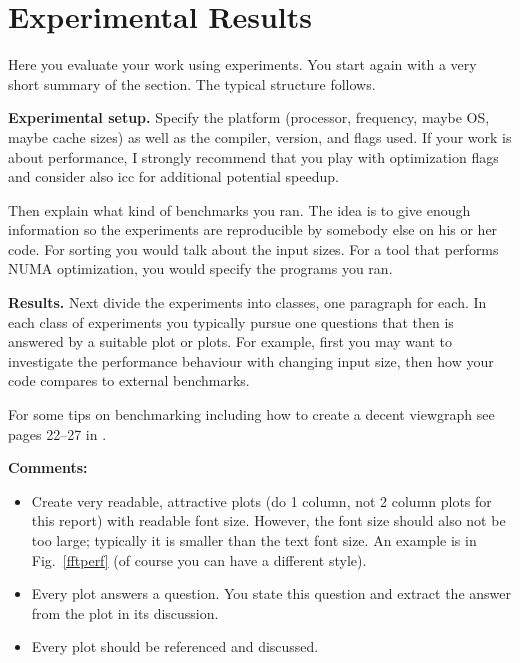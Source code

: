 \documentclass[letterpaper]{article}
\newcommand{\mypar}[1]{{\bf #1.}}
\begin{document}
\section{Experimental Results}\label{sec:exp}

Here you evaluate your work using experiments. You start again with a
very short summary of the section. The typical structure follows.

\mypar{Experimental setup} Specify the platform (processor, frequency, maybe OS, maybe cache sizes)
as well as the compiler, version, and flags used. If your work is about performance, 
I strongly recommend that you play with optimization flags and consider also icc for additional potential speedup.

Then explain what kind of benchmarks you ran. The idea is to give enough information so the experiments are reproducible by somebody else on his or her code.
For sorting you would talk about the input sizes. For a tool that performs NUMA optimization, you would specify the programs you ran.

\mypar{Results}
Next divide the experiments into classes, one paragraph for each. In each class of experiments you typically pursue one questions that then is answered by a suitable plot or plots. For example, first you may want to investigate the performance behaviour with changing input size, then how your code compares to external benchmarks.

For some tips on benchmarking including how to create a decent viewgraph see pages 22--27 in \cite{Pueschel:10}.

{\bf Comments:}
\begin{itemize}
\item Create very readable, attractive plots (do 1 column, not 2 column plots
for this report) with readable font size. However, the font size should also not be too large; typically it is smaller than the text font size.
An example is in Fig.~\ref{fftperf} (of course you can have a different style).
\item Every plot answers a question. You state this question and extract the
answer from the plot in its discussion.
\item Every plot should be referenced and discussed.
\end{itemize}

\end{document}
